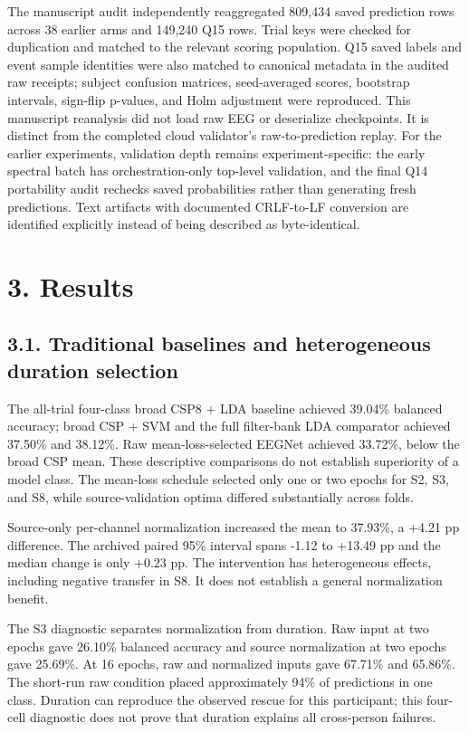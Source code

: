 \documentclass[11pt]{article}
\begin{document}
The manuscript audit independently reaggregated 809,434 saved prediction rows across 38 earlier arms and 149,240 Q15 rows. Trial keys were checked for duplication and matched to the relevant scoring population. Q15 saved labels and event sample identities were also matched to canonical metadata in the audited raw receipts; subject confusion matrices, seed-averaged scores, bootstrap intervals, sign-flip p-values, and Holm adjustment were reproduced. This manuscript reanalysis did not load raw EEG or deserialize checkpoints. It is distinct from the completed cloud validator's raw-to-prediction replay. For the earlier experiments, validation depth remains experiment-specific: the early spectral batch has orchestration-only top-level validation, and the final Q14 portability audit rechecks saved probabilities rather than generating fresh predictions. Text artifacts with documented CRLF-to-LF conversion are identified explicitly instead of being described as byte-identical.

\section*{3. Results}
\subsection*{3.1. Traditional baselines and heterogeneous duration selection}
The all-trial four-class broad CSP8 + LDA baseline achieved 39.04\% balanced accuracy; broad CSP + SVM and the full filter-bank LDA comparator achieved 37.50\% and 38.12\%. Raw mean-loss-selected EEGNet achieved 33.72\%, below the broad CSP mean. These descriptive comparisons do not establish superiority of a model class. The mean-loss schedule selected only one or two epochs for S2, S3, and S8, while source-validation optima differed substantially across folds.

Source-only per-channel normalization increased the mean to 37.93\%, a +4.21 pp difference. The archived paired 95\% interval spans -1.12 to +13.49 pp and the median change is only +0.23 pp. The intervention has heterogeneous effects, including negative transfer in S8. It does not establish a general normalization benefit.

The S3 diagnostic separates normalization from duration. Raw input at two epochs gave 26.10\% balanced accuracy and source normalization at two epochs gave 25.69\%. At 16 epochs, raw and normalized inputs gave 67.71\% and 65.86\%. The short-run raw condition placed approximately 94\% of predictions in one class. Duration can reproduce the observed rescue for this participant; this four-cell diagnostic does not prove that duration explains all cross-person failures.
\end{document}
